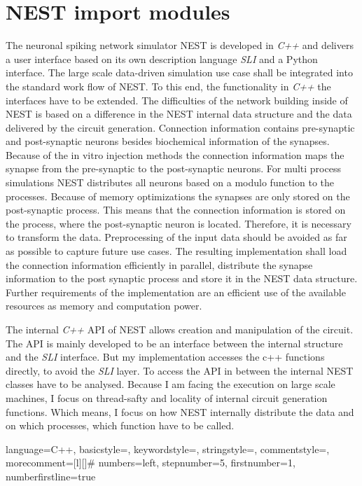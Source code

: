 \section{NEST import modules}
The neuronal spiking network simulator NEST is developed in \emph{C++} and delivers
a user interface based on its own description language \emph{SLI} and a Python interface.
The large scale data-driven simulation use case shall be integrated into the standard work flow of NEST.
To this end, the functionality in \emph{C++} the interfaces have to be extended.
The difficulties of the network building inside of NEST is based on a difference in 
the NEST internal data structure and the data delivered by the circuit generation.
Connection information contains pre-synaptic and post-synaptic neurons besides biochemical
information of the synapses. Because of the in vitro injection methods the
connection information maps the synapse from the pre-synaptic to the post-synaptic neurons.
For multi process simulations NEST distributes all neurons based on a modulo function 
to the processes. Because of memory optimizations the synapses are only stored on the
post-synaptic process. This means that the connection information is stored
on the process, where the post-synaptic neuron is located.
Therefore, it is necessary to transform the data.
Preprocessing of the input data should be avoided as far as possible to capture
future use cases.
The resulting implementation shall load the connection information efficiently in parallel,
distribute the synapse information to the post synaptic process and store it in
the NEST data structure.
Further requirements of the implementation are an efficient use of the available resources as
memory and computation power. 

The internal \emph{C++} API of NEST allows creation and manipulation of the circuit.
The API is mainly developed to be an interface between the internal structure
and the \emph{SLI} interface. But my implementation accesses the c++ functions directly,
to avoid the \emph{SLI} layer. To access the API in between the internal NEST classes
have to be analysed. Because I am facing the execution on large scale machines,
I focus on thread-safty and locality of internal circuit generation functions.
Which means, I focus on how NEST internally distribute the data and on which processes, which
function have to be called.


 {language=C++,
                basicstyle=\small\ttfamily,
                keywordstyle=\color{blue}\ttfamily,
                stringstyle=\color{red}\ttfamily,
                commentstyle=\color{green}\ttfamily,
                morecomment=[l][\color{magenta}]{\#}
                numbers=left,
  				stepnumber=5,    
  				firstnumber=1,
 				numberfirstline=true
}

